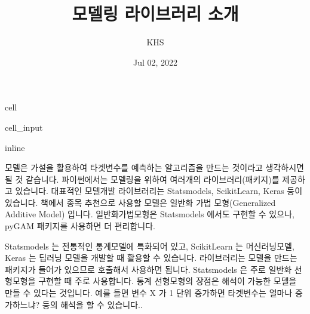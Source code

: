 \documentclass[letterpaper,10pt,english]{jupyterBook}
\title{모델링 라이브러리 소개}
\date{Jul 02, 2022}
\author{KHS}
\begin{document}
\pagestyle{empty}
\sphinxmaketitle
\pagestyle{plain}
\sphinxtableofcontents
\pagestyle{normal}
\label{\detokenize{chapter5/5.2.2_Modeling_Library::doc}}
\begin{sphinxuseclass}{cell}\begin{sphinxVerbatimInput}

\begin{sphinxuseclass}{cell_input}
\begin{sphinxVerbatim}[commandchars=\\\{\}]
   
 inline
   
   
   
 
  
\end{sphinxVerbatim}

\end{sphinxuseclass}\end{sphinxVerbatimInput}

\end{sphinxuseclass}


\sphinxAtStartPar
모델은 가설을 활용하여 타겟변수를 예측하는 알고리즘을 만드는 것이라고 생각하시면 될 것 같습니다. 파이썬에서는 모델링을 위하여 여러개의 라이브러리(패키지)를 제공하고 있습니다. 대표적인 모델개발 라이브러리는 Statsmodels, Scikit\sphinxhyphen{}Learn, Keras 등이 있습니다. 책에서 종목 추천으로 사용할 모델은 일반화 가법 모형(Generalized Additive Model) 입니다. 일반화가법모형은 Statsmodels 에서도 구현할 수 있으나, pyGAM 패키지를 사용하면 더 편리합니다.

\sphinxAtStartPar
Statsmodels 는 전통적인 통계모델에 특화되어 있고, Scikit\sphinxhyphen{}Learn 는 머신러닝모델, Keras 는 딥러닝 모델을 개발할 때 활용할 수 있습니다. 라이브러리는 모델을 만드는 패키지가 들어가 있으므로 호출해서 사용하면 됩니다. Statsmodels 은 주로 일반화 선형모형을 구현할 때 주로 사용합니다. 통계 선형모형의 장점은 해석이 가능한 모델을 만들 수 있다는 것입니다. 예를 들면 변수 X 가 1 단위 증가하면 타겟변수는 얼마나 증가하느냐? 등의 해석을 할 수 있습니다..
\end{document}
